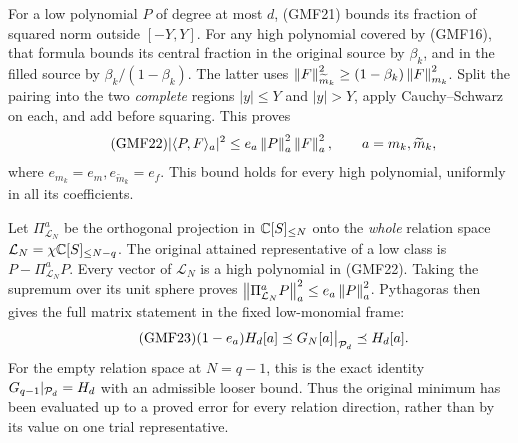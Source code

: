 For a low polynomial \(P\) of degree at most \(d\), (GMF21)
bounds its fraction of squared norm outside \([-Y,Y]\).
For any high polynomial covered by (GMF16), that formula
bounds its central fraction in the original source by
\(\beta_k\), and in the filled source by
\(\beta_k/(1-\beta_k)\).
The latter uses
\(\left\lVert F\right\rVert_{\widetilde m_k}^2\ge(1-\beta_k)\left\lVert F\right\rVert_{m_k}^2\).
Split the pairing into the two \emph{complete} regions
\(|y|\le Y\) and \(|y|>Y\), apply Cauchy--Schwarz on each,
and add before squaring.  This proves
\begin{equation}\tag{GMF22}
 |\langle P,F\rangle_a|^2
 \le e_a\left\lVert P\right\rVert_a^2\left\lVert F\right\rVert_a^2,\qquad
 a=m_k,\widetilde m_k,
\end{equation}
where \(e_{m_k}=e_m,e_{\widetilde m_k}=e_f\).
This bound holds for every high polynomial, uniformly in all
its coefficients.

Let \(\Pi_{\mathcal L_N}^a\) be the orthogonal projection in
\(\mathbb C[S]_{\le N}\) onto the \emph{whole} relation space
\(\mathcal L_N=\chi\mathbb C[S]_{\le N-q}\).
The original attained representative of a low class is
\(P-\Pi_{\mathcal L_N}^aP\).
Every vector of \(\mathcal L_N\) is a high polynomial in
(GMF22).  Taking the supremum over its unit sphere proves
\(\left\lVert\Pi_{\mathcal L_N}^aP\right\rVert_a^2\le e_a\left\lVert P\right\rVert_a^2\).
Pythagoras then gives the full matrix statement in the
fixed low-monomial frame:
\begin{equation}\tag{GMF23}
 (1-e_a)H_d[a]\preceq G_N[a]\big|_{\mathcal P_d}
                         \preceq H_d[a].
\end{equation}
For the empty relation space at \(N=q-1\), this is the
exact identity \(G_{q-1}|_{\mathcal P_d}=H_d\) with an admissible
looser bound.  Thus the original minimum has been evaluated
up to a proved error for every relation direction, rather
than by its value on one trial representative.

